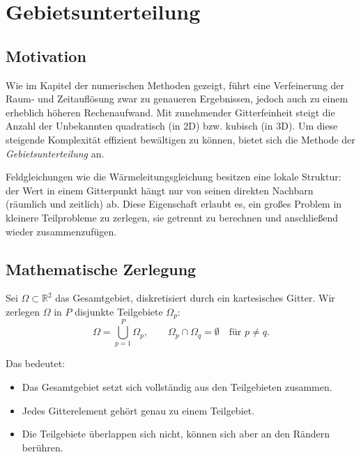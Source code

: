 %
%
%
\section{Gebietsunterteilung}
\label{parallelisierung:sec:dd}

\subsection{Motivation}
Wie im Kapitel der numerischen Methoden gezeigt, führt eine Verfeinerung der Raum- und Zeitauflösung zwar zu genaueren Ergebnissen, jedoch auch zu einem erheblich höheren Rechenaufwand. 
Mit zunehmender Gitterfeinheit steigt die Anzahl der Unbekannten quadratisch (in 2D) bzw. kubisch (in 3D).  
Um diese steigende Komplexität effizient bewältigen zu können, bietet sich die Methode der \emph{Gebietsunterteilung} an.

Feldgleichungen wie die Wärmeleitungsgleichung besitzen eine lokale Struktur: 
der Wert in einem Gitterpunkt hängt nur von seinen direkten Nachbarn (räumlich und zeitlich) ab.  
Diese Eigenschaft erlaubt es, ein großes Problem in kleinere Teilprobleme zu zerlegen, sie getrennt zu berechnen und anschließend wieder zusammenzufügen.

\subsection{Mathematische Zerlegung}
Sei $\Omega \subset \mathbb{R}^2$ das Gesamtgebiet, diskretisiert durch ein kartesisches Gitter.  
Wir zerlegen $\Omega$ in $P$ disjunkte Teilgebiete $\Omega_p$:
\begin{equation}
	\Omega = \bigcup_{p=1}^P \Omega_p,
	\qquad 
	\Omega_p \cap \Omega_q = \emptyset \quad \text{für } p \neq q.
\end{equation}

Das bedeutet:
\begin{itemize}
	\item Das Gesamtgebiet setzt sich vollständig aus den Teilgebieten zusammen.
	\item Jedes Gitterelement gehört genau zu einem Teilgebiet.
	\item Die Teilgebiete überlappen sich nicht, können sich aber an den Rändern berühren.
\end{itemize}

